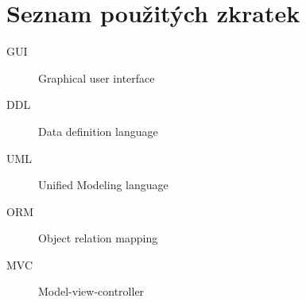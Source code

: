 \documentclass[thesis=B,czech]{FITthesis}[2012/06/26]
\begin{document}
\chapter{Seznam použitých zkratek}
\begin{description}
	\item[GUI] Graphical user interface
	\item[DDL] Data definition language
	\item[UML] Unified Modeling language
	\item[ORM] Object relation mapping
	\item[MVC] Model-view-controller
\end{description}


% 
% 
% 
% 
% 
\end{document}
